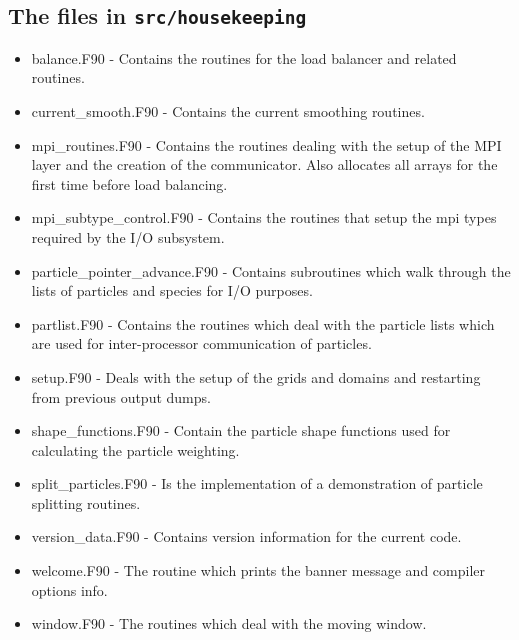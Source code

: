 \documentclass[12pt,a4paper]{article}
\newcommand{\inlinecode}[1]{{\color{warwickred} \bf\texttt{#1}}}
\newcommand{\EPOCH}{{\color{warwickdark}\fontfamily{phv}\selectfont{EPOCH}}}
\begin{document}
\subsection{The files in \inlinecode{src/housekeeping}}
\begin{itemize}
\item balance.F90 - Contains the routines for the load balancer and related
  routines.
\item current\_smooth.F90 - Contains the current smoothing routines.
\item mpi\_routines.F90 - Contains the routines dealing with the setup of the
  MPI layer and the creation of the communicator. Also allocates all arrays
  for the first time before load balancing.
\item mpi\_subtype\_control.F90 - Contains the routines that setup the mpi
  types required by the I/O subsystem.
\item particle\_pointer\_advance.F90 - Contains subroutines which walk through
  the lists of particles and species for I/O purposes.
\item partlist.F90 - Contains the routines which deal with the particle lists
  which are used for inter-processor communication of particles.
\item setup.F90 - Deals with the setup of the grids and domains and restarting
  from previous output dumps.
\item shape\_functions.F90 - Contain the particle shape functions used for
  calculating the particle weighting.
\item split\_particles.F90 - Is the implementation of a demonstration of
  particle splitting routines.
\item version\_data.F90 - Contains version information for the current {\EPOCH}
  code.
\item welcome.F90 - The routine which prints the banner message and compiler
  options info.
\item window.F90 - The routines which deal with the moving window.
\end{itemize}
\end{document}
